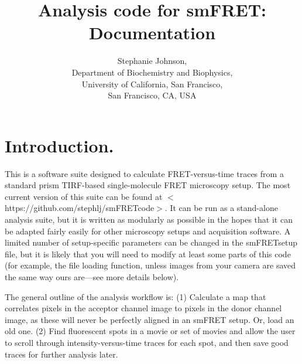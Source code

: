 \documentclass[11pt]{article}
\begin{document}
\title{Analysis code for smFRET: Documentation}

\author{%
Stephanie Johnson,\\Department of Biochemistry and
     Biophysics, \\University of California, San Francisco, \\San Francisco, CA, USA\\
}
\date{}

\maketitle

\tableofcontents

\newpage

\section{Introduction.}

This is a software suite designed to calculate FRET-versus-time traces from a standard prism TIRF-based single-molecule FRET microscopy setup.  The most current version of this suite can be found at $<$https://github.com/stephlj/smFRETcode$>$.  It can be run as a stand-alone analysis suite, but it is written as modularly as possible in the hopes that it can be adapted fairly easily for other microscopy setups and acquisition software.  A limited number of setup-specific parameters can be changed in the smFRETsetup file, but it is likely that you will need to modify at least some parts of this code (for example, the file loading function, unless images from your camera are saved the same way ours are---see more details below). %

The general outline of the analysis workflow is: (1) Calculate a map that correlates pixels in the acceptor channel image to pixels in the donor channel image, as these will never be perfectly aligned in an smFRET setup. Or, load an old one. (2) Find fluorescent spots in a movie or set of movies and allow the user to scroll through intensity-versus-time traces for each spot, and then save good traces for further analysis later.
\end{document}
